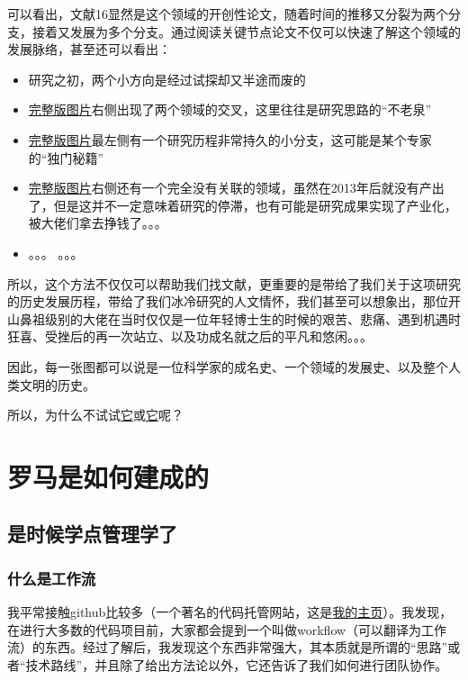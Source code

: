 \documentclass[UTF8,oneside]{ctexbook}
\begin{document}
可以看出，文献16显然是这个领域的开创性论文，随着时间的推移又分裂为两个分支，接着又发展为多个分支。通过阅读关键节点论文不仅可以快速了解这个领域的发展脉络，甚至还可以看出：

\begin{itemize}
	\item 研究之初，两个小方向是经过试探却又半途而废的
	\item \href{https://raw.githubusercontent.com/lonelybag/Latex_lonelybag/V1.0/Script/002_NOTE_of_MASTER/Figure/typical_trace_full.jpg}{完整版图片}右侧出现了两个领域的交叉，这里往往是研究思路的“不老泉”
	\item \href{https://raw.githubusercontent.com/lonelybag/Latex_lonelybag/V1.0/Script/002_NOTE_of_MASTER/Figure/typical_trace_full.jpg}{完整版图片}最左侧有一个研究历程非常持久的小分支，这可能是某个专家的“独门秘籍”
	\item \href{https://raw.githubusercontent.com/lonelybag/Latex_lonelybag/V1.0/Script/002_NOTE_of_MASTER/Figure/typical_trace_full.jpg}{完整版图片}右侧还有一个完全没有关联的领域，虽然在2013年后就没有产出了，但是这并不一定意味着研究的停滞，也有可能是研究成果实现了产业化，被大佬们拿去挣钱了。。。
	\item 。。。 。。。
\end{itemize}

所以，这个方法不仅仅可以帮助我们找文献，更重要的是带给了我们关于这项研究的历史发展历程，带给了我们冰冷研究的人文情怀，我们甚至可以想象出，那位开山鼻祖级别的大佬在当时仅仅是一位年轻博士生的时候的艰苦、悲痛、遇到机遇时狂喜、受挫后的再一次站立、以及功成名就之后的平凡和悠闲。。。

因此，每一张图都可以说是一位科学家的成名史、一个领域的发展史、以及整个人类文明的历史。

所以，为什么不试试\href{https://zhuanlan.zhihu.com/p/20902898}{它}或\href{https://zhuanlan.zhihu.com/p/30970993}{它}呢？

\chapter{罗马是如何建成的}
\section{是时候学点管理学了}
\subsection{什么是工作流}
我平常接触github比较多（一个著名的代码托管网站，这是\href{https://github.com/lonelybag?tab=repositories}{我的主页}）。我发现，在进行大多数的代码项目前，大家都会提到一个叫做workflow（可以翻译为工作流）的东西。经过了解后，我发现这个东西非常强大，其本质就是所谓的“思路”或者“技术路线”，并且除了给出方法论以外，它还告诉了我们如何进行团队协作。
\end{document}
